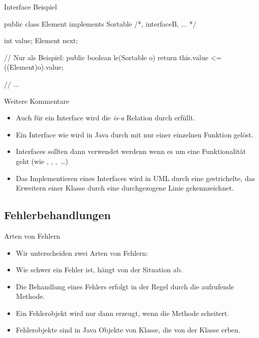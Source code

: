 \begin{frame}[fragile,c]{Interface Beispiel}
\begin{plainjava}
public class Element implements Sortable /*, interfaceB, ... */ {
    int value;
    Element next;

    // Nur als Beispiel:
    public boolean le(Sortable o) {
        return this.value <= ((Element)o).value;
    }

    // ...
}
\end{plainjava}
\end{frame}

\begin{frame}{Weitere Kommentare}
    \begin{itemize}[<+(1)->]
        \widei
        \item Auch für ein Interface wird die \emph{is-a} Relation durch  erfüllt.
        \item Ein Interface wie  wird in Java durch  mit nur einer einzelnen Funktion  gelöst.
        \item Interfaces sollten dann verwendet werdenn wenn es um eine Funktionalität geht (wie , , ,~\ldots)
        \item Das Implementieren eines Interfaces wird in UML durch eine gestrichelte, das Erweitern einer Klasse durch eine durchgezogene  Linie gekennzeichnet.%
    \end{itemize}
\end{frame}

\subsection{Fehlerbehandlungen}
\begin{frame}{Arten von Fehlern}
    \begin{itemize}[<+(1)->]
        \widei
        \item Wir unterscheiden zwei Arten von Fehlern: 
        \item Wie schwer ein Fehler ist, hängt von der Situation ab.
        \item Die Behandlung eines Fehlers erfolgt in der Regel durch die aufrufende Methode.
        \item Ein Fehlerobjekt wird nur dann erzeugt,\pause{} wenn die Methode scheitert.
        \item Fehlerobjekte sind in Java Objekte von Klasse,\pause{} die von der  Klasse erben.
    \end{itemize}
\end{frame}

